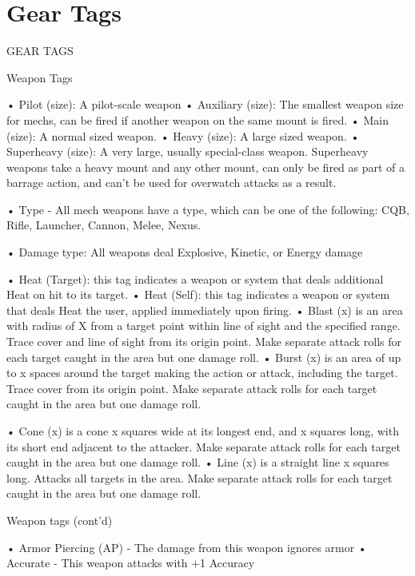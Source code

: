 \section{Gear Tags}

      GEAR TAGS

Weapon Tags

•  \hypertarget{Pilot}{Pilot (size)}: A pilot-scale weapon
•  \hypertarget{Auxiliary}{Auxiliary (size)}: The smallest weapon size for mechs, can be fired if another weapon on the
  same mount is fired.
•  \hypertarget{Main}{Main (size)}: A normal sized weapon.
•  \hypertarget{Heavy}{Heavy (size)}: A large sized weapon.
•  \hypertarget{Superheavy}{Superheavy (size)}: A very large, usually special-class weapon. Superheavy weapons take a
  heavy mount and any other mount, can only be fired as part of a barrage action, and can't be
  used for overwatch attacks as a result.

•  \hypertarget{Type}{Type} - All mech weapons have a type, which can be one of the following: CQB, Rifle,
  Launcher, Cannon, Melee, Nexus.

•  \hypertarget{DamageType}{Damage type}: All weapons deal Explosive, Kinetic, or Energy damage


•  \hypertarget{HeatTarget}{Heat (Target)}: this tag indicates a weapon or system that deals additional Heat on hit to its
  target.
•  Heat (Self): this tag indicates a weapon or system that deals Heat the user, applied immediately upon firing.
•  \hypertarget{Blast}{Blast (x)} is an area with radius of X from a target point within line of sight and the specified
  range. Trace cover and line of sight from its origin point. Make separate attack rolls for each
  target caught in the area but one damage roll.
•  \hypertarget{Burst}{Burst (x)} is an area of up to x spaces around the target making the action or attack, including
  the target. Trace cover from its origin point. Make separate attack rolls for each target caught in
  the area but one damage roll.

•  \hypertarget{Cone}{Cone (x)} is a cone x squares wide at its longest end, and x squares long, with its short end
  adjacent to the attacker. Make separate attack rolls for each target caught in the area but one
  damage roll.
•  \hypertarget{Line}{Line (x)} is a straight line x squares long. Attacks all targets in the area. Make separate attack
  rolls for each target caught in the area but one damage roll.

Weapon tags (cont'd)

•  \hypertarget{AP}{Armor Piercing (AP)} - The damage from this weapon ignores armor
•  \hypertarget{Accurate}{Accurate} - This weapon attacks with +1 Accuracy

